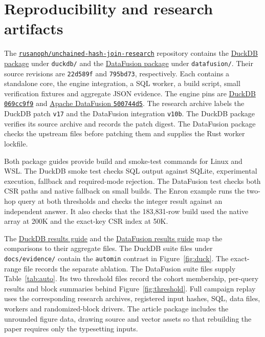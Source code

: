 \documentclass[11pt,a4paper]{article}
\newcommand{\artifactrepo}{https://github.com/rusanoph/unchained-hash-join-research}
\newcommand{\artifactlink}[2]{\href{\artifactrepo/blob/b33f6e504467b7c381943539dc57e45d543de1c5/#1}{#2}}
\begin{document}
\section{Reproducibility and research artifacts}\label{sec:artifacts}
The \href{\artifactrepo}{\texttt{rusanoph/unchained-hash-join-research}} repository contains the
\artifactlink{duckdb/README.md}{DuckDB package} under \texttt{duckdb/} and the
\artifactlink{datafusion/README.md}{DataFusion package} under \texttt{datafusion/}. Their source
revisions are \texttt{22d589f} and \texttt{795bd73}, respectively. Each contains a standalone
core, the engine integration, a SQL worker, a build script, small verification fixtures and
aggregate JSON evidence. The engine pins are
\href{https://github.com/duckdb/duckdb/tree/069cc9f9b5be802405797faecc284961b07c70ef}{DuckDB
\texttt{069cc9f9}}
and
\href{https://github.com/apache/datafusion/tree/500744d5c25499055e3b2ca46b022bc425989203}{Apache
DataFusion \texttt{500744d5}}. The research archive labels the DuckDB patch \texttt{v17}
and the DataFusion integration \texttt{v10b}. The DuckDB package verifies its source archive and
records the patch digest. The DataFusion package checks the upstream files before patching them
and supplies the Rust worker lockfile.

Both package guides provide build and smoke-test commands for Linux and WSL. The DuckDB
smoke test checks SQL output against SQLite, experimental execution, fallback and required-mode
rejection. The DataFusion test checks both CSR paths and native fallback on small builds.
The Enron example runs the two-hop query at both thresholds and checks the integer result
against an independent answer. It also checks that the 183,831-row build used
the native array at 200K and the exact-key CSR index at 50K.

The \artifactlink{duckdb/docs/results.md}{DuckDB results guide} and the
\artifactlink{datafusion/docs/results.md}{DataFusion results guide} map the comparisons to their
aggregate files. The DuckDB suite files under \texttt{docs/evidence/} contain the \texttt{automin}
contrast in Figure~\ref{fig:duck}. The exact-range file records the separate ablation. The
DataFusion suite files supply Table~\ref{tab:auto}. Its two threshold files record the cohort
membership, per-query results and block summaries behind Figure~\ref{fig:threshold}. Full campaign
replay uses the corresponding research archives, registered input hashes, SQL, data files, workers
and randomized-block drivers. The article package includes the unrounded figure data, drawing
source and vector assets so that rebuilding the paper requires only the typesetting inputs.
\end{document}
